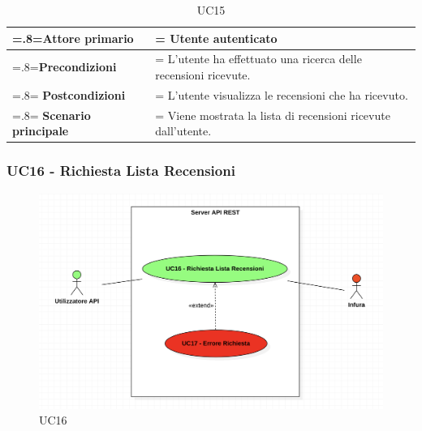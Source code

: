             \begin{table}[H]
                \centering
                \renewcommand{\arraystretch}{1.8}
                \renewcommand\tabularxcolumn[1]{m{#1}}
                \begin{tabularx}{0.9\textwidth} {
                    >{\hsize=.8\hsize\linewidth=\hsize}X
                    >{\hsize=1.2\hsize\linewidth=\hsize}X}
                    \hline
                    \textbf{Attore primario} & Utente autenticato \\
                    \hline
                    \textbf{Precondizioni} & L'utente ha effettuato una ricerca delle recensioni ricevute. \\
                    \hline
                    \textbf{Postcondizioni} & L'utente visualizza le recensioni che ha ricevuto. \\
                    \hline
                    \textbf{Scenario principale} & Viene mostrata la lista di recensioni ricevute dall'utente. \\
                    \hline
                \end{tabularx}
                \caption{UC15}
            \end{table}

        \subsubsection{UC16 - Richiesta Lista Recensioni}
        \label{UC16}

            \begin{figure}[H]
                \centering
                \includegraphics[scale=0.6]{src/img/UC16.png}
                \caption{UC16}
            \end{figure}

